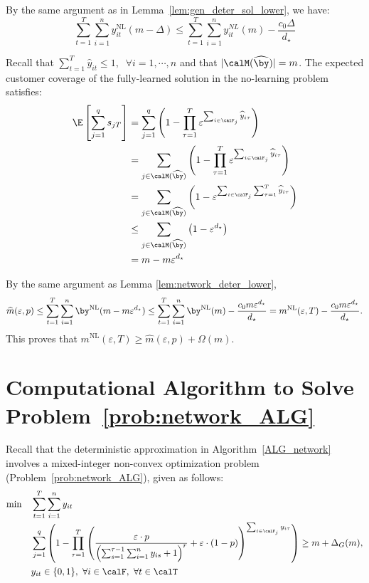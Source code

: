 \documentclass[blindrev]{informs3noheader}
\begin{document}
By the same argument as in Lemma~\ref{lem:gen_deter_sol_lower}, we have:
\[\sum_{t=1}^T \sum_{i=1}^n y_{it}^{\mathrm{NL}}(m-\Delta) \leq\sum_{t=1}^T \sum_{i=1}^n y_{it}^{NL}(m) - \frac{c_0\Delta}{d_\star} \]

Recall that $\sum_{t=1}^T\widehat{y}_{it}\leq 1, \;\;\forall i=1,\cdots,n$ and that $|\calM(\widehat{\by})|=m$. The expected customer coverage of the fully-learned solution in the no-learning problem satisfies:
\begin{align*}
\E\left[\sum_{j=1}^q s_{jT}\right]
&= \sum_{j=1}^q\left(1-\prod_{\tau=1}^T \varepsilon^{\sum_{i \in \calF_j} \widehat{y}_{i\tau}} \right)\\
&=\sum_{j \in \calM(\widehat{\by})} \left(1 - \prod_{\tau=1}^T \varepsilon^{\sum_{i \in \calF_j} \widehat{y}_{i\tau}}\right) \\
&=\sum_{j \in \calM(\widehat{\by})} \left(1 - \varepsilon^{\sum_{i \in \calF_j} \sum_{\tau=1}^T\widehat{y}_{i\tau}}\right) \\
&\leq\sum_{j \in \calM(\widehat{\by})} \left(1 - \varepsilon^{d_\star}\right) \\
&=  m - m \varepsilon^{d_\star}
\end{align*}

By the same argument as Lemma \ref{lem:network_deter_lower},
\[\widehat{m}(\varepsilon,p) \leq \sum_{t=1}^T \sum_{i=1}^n \by^{\mathrm{NL}}(m-m \varepsilon^{d_\star})\leq \sum_{t=1}^T \sum_{i=1}^n \by^{\mathrm{NL}}(m) - \frac{c_0m \varepsilon^{d_\star}}{d_\star}=m^{\mathrm{NL}}(\varepsilon, T) - \frac{c_0m \varepsilon^{d_\star}}{d_\star}.\]
This proves that $m^{\mathrm{NL}}(\varepsilon, T)\geq \widehat{m}(\varepsilon,p)+\Omega(m)$.
\hfill\Halmos

\section{Computational Algorithm to Solve Problem~\eqref{prob:network_ALG}}
\label{app:network_ALG}

Recall that the deterministic approximation in Algorithm~\ref{ALG_network} involves a mixed-integer non-convex optimization problem (Problem~\eqref{prob:network_ALG}), given as follows:
\begin{align*}
\min \quad & \sum_{t=1}^T \sum_{i=1}^n y_{it}\\
\quad& \sum_{j=1}^q \left(1-\prod_{\tau=1}^T \left(\frac{\varepsilon\cdot p }{\left(\sum_{s=1}^{\tau-1} \sum_{i=1}^n y_{is} +1\right)^r}+\varepsilon\cdot(1-p)\right)^{\sum_{i \in \calF_j} y_{i\tau}}\right) \geq m+\Delta_G(m),\\
\quad& y_{it}\in\{0,1\},\ \forall i\in \calF, \ \forall t\in\calT
\end{align*}
\end{document}
